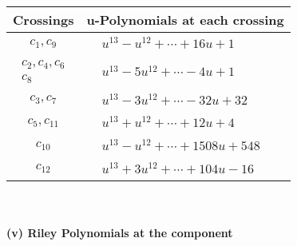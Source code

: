 \documentclass[1p]{elsarticle_modified}
\theoremstyle{definition}
\begin{document}
\begin{tabular}{m{50pt}|m{274pt}}
Crossings & \hspace{64pt}u-Polynomials at each crossing \\
\hline $$\begin{aligned}c_{1},c_{9}\end{aligned}$$&$\begin{aligned}
&u^{13}- u^{12}+\cdots+16 u+1
\end{aligned}$\\
\hline $$\begin{aligned}c_{2},c_{4},c_{6}\\c_{8}\end{aligned}$$&$\begin{aligned}
&u^{13}-5 u^{12}+\cdots-4 u+1
\end{aligned}$\\
\hline $$\begin{aligned}c_{3},c_{7}\end{aligned}$$&$\begin{aligned}
&u^{13}-3 u^{12}+\cdots-32 u+32
\end{aligned}$\\
\hline $$\begin{aligned}c_{5},c_{11}\end{aligned}$$&$\begin{aligned}
&u^{13}+u^{12}+\cdots+12 u+4
\end{aligned}$\\
\hline $$\begin{aligned}c_{10}\end{aligned}$$&$\begin{aligned}
&u^{13}- u^{12}+\cdots+1508 u+548
\end{aligned}$\\
\hline $$\begin{aligned}c_{12}\end{aligned}$$&$\begin{aligned}
&u^{13}+3 u^{12}+\cdots+104 u-16
\end{aligned}$\\
\hline
\end{tabular}\\~\\
\newpage\renewcommand{\arraystretch}{1}
\flushleft \textbf{(v) Riley Polynomials at the component}\newline \\
\end{document}
